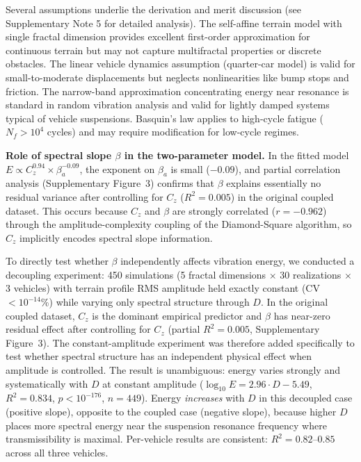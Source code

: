 \documentclass[11pt]{article}
\begin{document}
Several assumptions underlie the derivation and merit discussion (see Supplementary Note 5 for detailed analysis). The self-affine terrain model with single fractal dimension provides excellent first-order approximation for continuous terrain but may not capture multifractal properties or discrete obstacles\cite{Persson2005}. The linear vehicle dynamics assumption (quarter-car model) is valid for small-to-moderate displacements but neglects nonlinearities like bump stops and friction\cite{Wong2022,Gillespie1992}. The narrow-band approximation concentrating energy near resonance is standard in random vibration analysis\cite{Miles1954,Bendat2010} and valid for lightly damped systems typical of vehicle suspensions. Basquin's law applies to high-cycle fatigue ($N_f > 10^4$ cycles) and may require modification for low-cycle regimes\cite{Dowling2013}.

\textbf{Role of spectral slope $\beta$ in the two-parameter model.} In the fitted model $E \propto C_z^{0.94} \times \beta_a^{-0.09}$, the exponent on $\beta_a$ is small ($-0.09$), and partial correlation analysis (Supplementary Figure~3) confirms that $\beta$ explains essentially no residual variance after controlling for $C_z$ ($R^2 = 0.005$) in the original coupled dataset. This occurs because $C_z$ and $\beta$ are strongly correlated ($r = -0.962$) through the amplitude-complexity coupling of the Diamond-Square algorithm, so $C_z$ implicitly encodes spectral slope information.

To directly test whether $\beta$ independently affects vibration energy, we conducted a decoupling experiment: 450 simulations (5 fractal dimensions $\times$ 30 realizations $\times$ 3 vehicles) with terrain profile RMS amplitude held exactly constant (CV $< 10^{-14}$\%) while varying only spectral structure through $D$. In the original coupled dataset, $C_z$ is the dominant empirical predictor and $\beta$ has near-zero residual effect after controlling for $C_z$ (partial $R^2 = 0.005$, Supplementary Figure~3). The constant-amplitude experiment was therefore added specifically to test whether spectral structure has an independent physical effect when amplitude is controlled. The result is unambiguous: energy varies strongly and systematically with $D$ at constant amplitude ($\log_{10} E = 2.96 \cdot D - 5.49$, $R^2 = 0.834$, $p < 10^{-176}$, $n = 449$). Energy \emph{increases} with $D$ in this decoupled case (positive slope), opposite to the coupled case (negative slope), because higher $D$ places more spectral energy near the suspension resonance frequency where transmissibility is maximal. Per-vehicle results are consistent: $R^2 = 0.82$--$0.85$ across all three vehicles.
\end{document}
